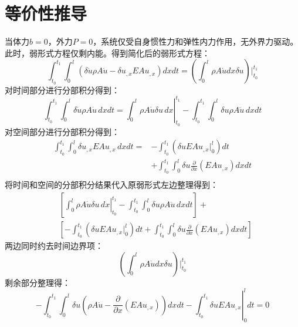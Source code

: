 \section{等价性推导}
当体力$b=0$，外力$P=0$，系统仅受自身惯性力和弹性内力作用，无外界力驱动。
此时，弱形式方程仅剩内能。得到简化后的弱形式方程：
\begin{equation}\label{3.15}
\int_{t_0}^{t_1} \int_{0}^{l} (\delta \dot u \rho A \dot u - \delta u_{,x} EA u_{,x}) dx dt = (\int_{0}^{l} \rho A \dot udx \delta u) \vert_{t_0}^{t_1}
\end{equation}
对时间部分进行分部积分得到：
\begin{equation}\label{3.16}
\int_{t_0}^{t_1} \int_{0}^{l} \delta \dot{u} \rho A \dot{u} \, dx dt = \left. \int_{0}^{l} \rho A \dot{u} \delta u \, dx \right|_{t_0}^{t_1} - \int_{t_0}^{t_1} \int_{0}^{l} \delta u \rho A \ddot{u} \, dx dt 
\end{equation}
对空间部分进行分部积分得到：
\begin{equation}\label{3.17}
\begin{split}
\int_{t_0}^{t_1} \int_{0}^{l} \delta u_{,x} EA u_{,x} \, dx dt = &- \int_{t_0}^{t_1} \left( \delta u  EA u_{,x} \bigg|_{0}^{l} \right) dt \\ 
&+ \int_{t_0}^{t_1} \int_{0}^{l} \delta u  \frac{\partial}{\partial x} \left( EA u_{,x} \right) dx dt \\
\end{split}
\end{equation}
将时间和空间的分部积分结果代入原弱形式左边整理得到：
\begin{equation}\label{3.18}
\begin{split}
&\left[ \left. \int_{0}^{l} \rho A \dot{u} \delta u \, dx \right|_{t_0}^{t_1} - \int_{t_0}^{t_1} \int_{0}^{l} \delta u \rho A \ddot{u} \, dx dt \right] + \\
&\left[ - \int_{t_0}^{t_1} \left( \delta u  EA u_{,x} \bigg|_{0}^{l} \right) dt + \int_{t_0}^{t_1} \int_{0}^{l} \delta u  \frac{\partial}{\partial x} \left( EA u_{,x} \right) dx dt \right] 
\end{split}
\end{equation}
两边同时约去时间边界项：
\begin{equation}\label{3.19}
(\int_{0}^{l} \rho A \dot udx \delta u) \vert_{t_0}^{t_1}
\end{equation}
剩余部分整理得：
\begin{equation}\label{3.20}
- \int_{t_0}^{t_1} \int_{0}^{l} \delta u \left( \rho A \ddot{u} - \frac{\partial}{\partial x} \left( EA u_{,x} \right) \right) dx dt - \left. \int_{t_0}^{t_1} \delta u EA u_{,x} \right|_{0}^{l} dt =0
\end{equation}
